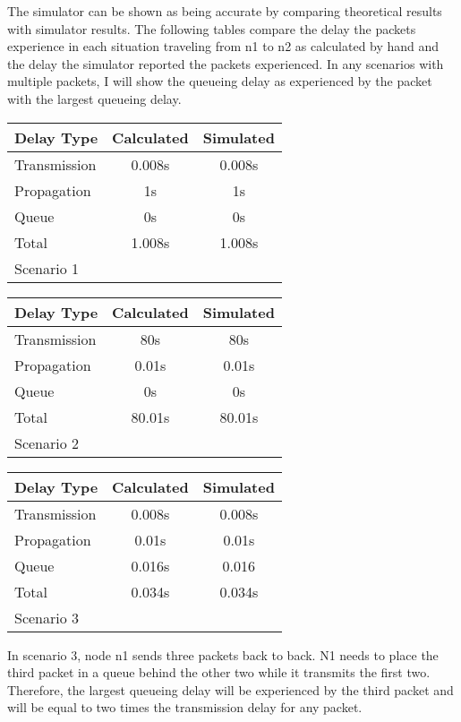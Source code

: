 \documentclass[11pt]{article}
\begin{document}
The simulator can be shown as being accurate by comparing theoretical results with simulator results. The following tables compare the delay the packets experience in each situation traveling from n1 to n2 as calculated by hand and the delay the simulator reported the packets experienced. In any scenarios with multiple packets, I will show the queueing delay as experienced by the packet with the largest queueing delay.

\vspace{0.5cm}
\begin{tabular}{lcc}
  \toprule
  Delay Type & Calculated & Simulated\\
  \midrule
  Transmission & 0.008s & 0.008s\\
  Propagation & 1s & 1s\\
  Queue & 0s & 0s\\
  Total & 1.008s & 1.008s\\
  \bottomrule
  Scenario 1
\end{tabular}
\vspace{0.5cm}

\vspace{0.5cm}
\begin{tabular}{lcc}
  \toprule
  Delay Type & Calculated & Simulated\\
  \midrule
  Transmission & 80s & 80s\\
  Propagation & 0.01s & 0.01s\\
  Queue & 0s & 0s\\
  Total & 80.01s & 80.01s\\
  \bottomrule
  Scenario 2
\end{tabular}
\vspace{0.5cm}

\vspace{0.5cm}
\begin{tabular}{lcc}
  \toprule
  Delay Type & Calculated & Simulated\\
  \midrule
  Transmission & 0.008s & 0.008s\\
  Propagation & 0.01s & 0.01s\\
  Queue & 0.016s & 0.016\\
  Total & 0.034s & 0.034s\\
  \bottomrule
  Scenario 3
\end{tabular}
\vspace{0.5cm}

In scenario 3, node n1 sends three packets back to back. N1 needs to place the third packet in a queue behind the other two while it transmits the first two. Therefore, the largest queueing delay will be experienced by the third packet and will be equal to two times the transmission delay for any packet.
\end{document}
